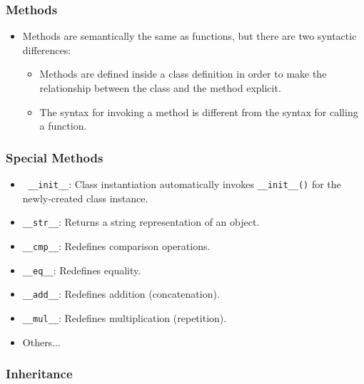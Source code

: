 \documentclass[handout]{beamer}
\begin{document}
\begin{frame}[fragile]
\frametitle{Methods}
\begin{itemize}
\item Methods are semantically the same as functions, but there are
two syntactic differences:

\begin{itemize}

\item Methods are defined \alert{inside} a class definition in order
to make the relationship between the class and the method explicit.

\item The syntax for invoking a method is \alert{different} from the
syntax for calling a function.

\end{itemize}
\end{itemize}
\end{frame}

\begin{frame}[fragile]
\frametitle{Special Methods}
\begin{itemize}
\item \verb" __init__": Class instantiation automatically invokes \verb!__init__()! for the newly-created class instance.
\item \verb"__str__":  Returns a string representation of an object.
\item \verb"__cmp__": Redefines comparison operations.	
\item \verb"__eq__": Redefines equality.
\item \verb"__add__": Redefines addition (concatenation).
\item \verb"__mul__": Redefines multiplication (repetition).
\item Others...

\end{itemize}
\end{frame}

\begin{frame}[fragile]
\frametitle{Inheritance}
\end{frame}
\end{document}
